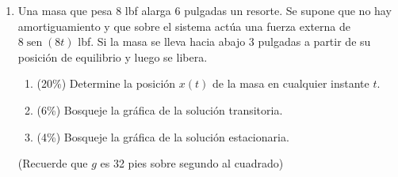 \documentclass[11pt]{article}
\begin{document}
\begin{enumerate}
\begin{enumerate}
\item{} (20\%) Halle la solución general de la ecuación diferencial
\[
x^2y''+xy'+y = \sec(\ln x), \qquad x>0.
\]
\end{enumerate}

\item{} Una masa que pesa 8 lbf alarga 6 pulgadas un resorte. Se supone que no hay amortiguamiento y que sobre el sistema actúa una fuerza externa de $8\operatorname{sen}(8t)$ lbf. Si la masa se lleva hacia abajo 3 pulgadas a partir de su posición de equilibrio y luego se libera.
\begin{enumerate}
\item{} (20\%) Determine la posición $x(t)$ de la masa en cualquier instante $t$.
\item{} (6\%) Bosqueje la gráfica de la solución transitoria.
\item{} (4\%) Bosqueje la gráfica de la solución estacionaria.
\end{enumerate}
\noindent (Recuerde que $g$ es 32 pies sobre segundo al cuadrado)
\end{enumerate}

\examfooter
\end{document}
